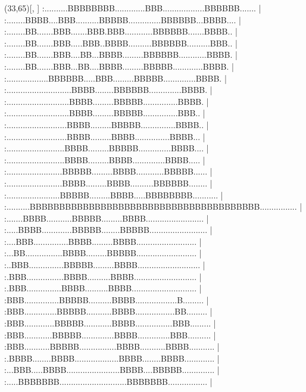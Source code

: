 
\newsavebox{\CalH}  %
\newcommand{\ScriptH}%
{\raisebox{-0.5 pt}{\SH}\kern 1 pt}%
\sprite{\SH}(33,65)[\wd\CalH, \ht\CalH]     %
:..........BBBBBBBB.............BBB..................BBBBBB....... |
:........BBBB....BBB..........BBBBB..............BBBBBB...BBBB.... |
:........BB.......BBB.......BBB.BBB............BBBBBB.......BBBB.. |
:........BB.......BBB.....BBB..BBBB..........BBBBBB..........BBB.. |
:........BB.......BBB....BB...BBBB.........BBBBBB............BBBB. |
:........BB.......BBB...BB....BBBB.........BBBBB.............BBBB. |
:..................BBBBBB.....BBB.........BBBBB..............BBBB. |
:............................BBBB........BBBBBB..............BBBB. |
:...........................BBBB.........BBBBB...............BBBB. |
:...........................BBBB.........BBBBB...............BBB.. |
:..........................BBBB.........BBBBB...............BBBB.. |
:..........................BBBB.........BBBB...............BBBB... |
:.........................BBBB.........BBBBB..............BBBB.... |
:.........................BBBB.........BBBB..............BBBB..... |
:........................BBBBB.........BBBB............BBBBB...... |
:........................BBBB.........BBBB..........BBBBBB........ |
:.......................BBBBB.........BBBB.....BBBBBBBB........... |
:..........BBBBBBBBBBBBBBBBBBBBBBBBBBBBBBBBBBBBBBB................ |
:.......BBBB...........BBBBB.........BBBB......................... |
:.....BBBB.............BBBBB........BBBBB......................... |
:....BBB...............BBBB.........BBBB.......................... |
:...BB................BBBB.........BBBBB.......................... |
:..BBB...............BBBBB.........BBBB........................... |
:.BBB................BBBB..........BBBB........................... |
:.BBB...............BBBB..........BBBB............................ |
:BBB...............BBBBB..........BBBB..................B......... |
:BBB..............BBBBB...........BBBB.................BB......... |
:BBB.............BBBBB............BBBB................BBB......... |
:BBB............BBBBB..............BBBB..............BBB.......... |
:BBB...........BBBBB................BBBB...........BBBB........... |
:.BBBB........BBBB...................BBBB........BBBB............. |
:...BBB.....BBBB.......................BBBB....BBBBB.............. |
:.....BBBBBBB.............................BBBBBBB................. |
\endsprite

